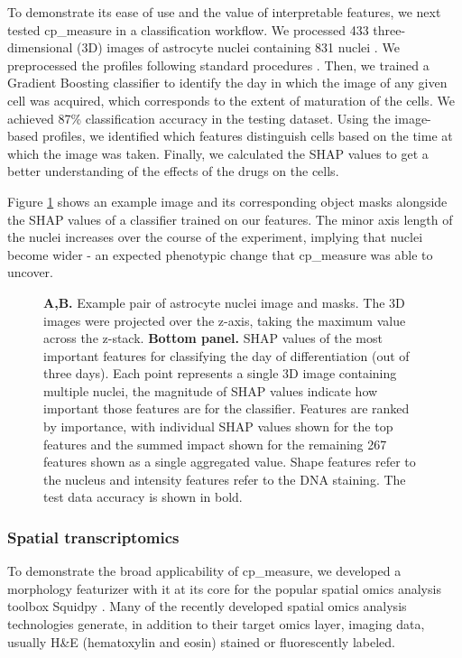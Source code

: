 \documentclass{article}
\begin{document}
To demonstrate its ease of use and the value of interpretable features, we next tested cp\_measure in a classification workflow. We processed 433 three-dimensional (3D) images of astrocyte nuclei containing 831 nuclei \citep{kalinin3DCellNuclear2018}. We preprocessed the profiles following standard procedures \citep{caicedoDataanalysisStrategiesImagebased2017}. Then, we trained a Gradient Boosting classifier to identify the day in which the image of any given cell was acquired, which corresponds to the extent of maturation of the cells. We achieved 87\% classification accuracy in the testing dataset. Using the image-based profiles, we identified which features distinguish cells based on the time at which the image was taken. Finally, we calculated the SHAP values \citep{sundararajanManyShapleyValues2020} to get a better understanding of the effects of the drugs on the cells.

Figure \ref{fig:astrocytes} shows an example image and its corresponding object masks alongside the SHAP values of a classifier trained on our features. The minor axis length of the nuclei increases over the course of the experiment, implying that nuclei become wider - an expected phenotypic change that cp\_measure was able to uncover.

\begin{figure}[htbp]
\centering

\caption{\label{fig:astrocytes}\textbf{A,B.} Example pair of astrocyte nuclei image and masks. The 3D images were projected over the z-axis, taking the maximum value across the z-stack. \textbf{Bottom panel.} SHAP values of the most important features for classifying the day of differentiation (out of three days). Each point represents a single 3D image containing multiple nuclei, the magnitude of SHAP values indicate how important those features are for the classifier. Features are ranked by importance, with individual SHAP values shown for the top features and the summed impact shown for the remaining 267 features shown as a single aggregated value. Shape features refer to the nucleus and intensity features refer to the DNA staining. The test data accuracy is shown in bold.}
\end{figure}

\subsubsection{Spatial transcriptomics}
\label{sec:org5711d86}
To demonstrate the broad applicability of cp\_measure, we developed a morphology featurizer with it at its core for the popular spatial omics analysis toolbox Squidpy \citep{pallaSquidpyScalableFramework2022}.
Many of the recently developed spatial omics analysis technologies generate, in addition to their target omics layer, imaging data, usually H\&E (hematoxylin and eosin) stained or fluorescently labeled. 
\end{document}
